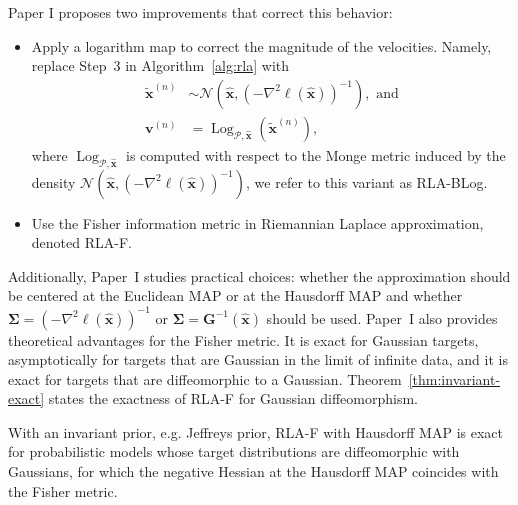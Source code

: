 Paper I proposes two improvements that correct this behavior:
\begin{itemize}
    \item Apply a logarithm map to correct the magnitude of the velocities. Namely, replace Step~3 in Algorithm~\ref{alg:rla} with 
    \begin{align*}
	\tilde{\boldsymbol{x}}^{(n)} &\sim \mathcal{N}\!\left(\hat{\boldsymbol{x}}, (-\nabla^2 \ell(\hat{\boldsymbol{x}}))^{-1}\right), \text{ and} \\
	\boldsymbol{v}^{(n)} &= \operatorname{Log}_{\mathcal{P},\hat{\boldsymbol{x}}}(\tilde{\boldsymbol{x}}^{(n)}),
	\end{align*}    
    where $\operatorname{Log}_{\mathcal{P},\hat{\boldsymbol{x}}}$ is computed with respect to the Monge metric induced by the density $\mathcal{N}\!\left(\hat{\boldsymbol{x}}, (-\nabla^2 \ell(\hat{\boldsymbol{x}}))^{-1}\right)$, we refer to this variant as RLA-BLog.
    \item Use the Fisher information metric in Riemannian Laplace approximation, denoted RLA-F.
\end{itemize}

Additionally, Paper~I studies practical choices: whether the approximation should be centered at the Euclidean MAP or at the Hausdorff MAP and whether $\mathbf{\Sigma}=(-\nabla^2\ell(\boldsymbol{\hat{x}}))^{-1}$ or $\mathbf{\Sigma}=\mathbf{G}^{-1}(\boldsymbol{\hat{x}})$ should be used.
Paper~I also provides theoretical advantages for the Fisher metric. It is exact for Gaussian targets, asymptotically for targets that are Gaussian in the limit of infinite data, and it is  exact for targets that are diffeomorphic to a Gaussian. Theorem~\ref{thm:invariant-exact} states the exactness of RLA-F for Gaussian diffeomorphism. 

\begin{theorem}
    With an invariant prior, e.g. Jeffreys prior, 
    RLA-F with Hausdorff MAP is exact for probabilistic models whose target distributions are diffeomorphic with Gaussians, for which the negative Hessian at the Hausdorff MAP coincides with the Fisher metric.
\label{thm:invariant-exact}
\end{theorem}


